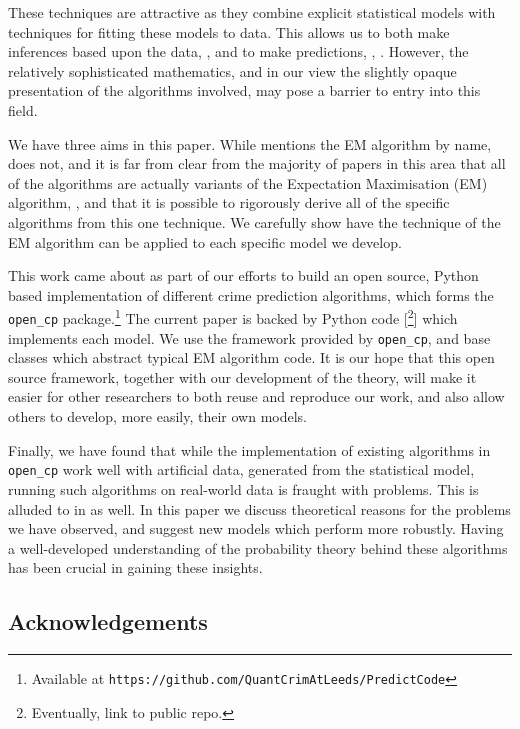 \documentclass[twoside,a4paper]{article}
\theoremstyle{plain}
\theoremstyle{definition}
\begin{document}
These techniques are attractive as they combine explicit statistical models with techniques
for fitting these models to data.  This allows us to both make inferences based upon the
data, \cite[Section~4]{sepp}, and to make predictions, \cite[Section~5]{sepp}, \cite{sepp2, rc}.
However, the relatively sophisticated mathematics, and in our view the slightly
opaque presentation of the algorithms involved, may pose a barrier to entry into this field.

We have three aims in this paper.  While \cite{sepp2} mentions the EM algorithm by name,
\cite{sepp} does not, and it is far from clear from the majority of papers in this area
that all of the algorithms are actually variants of the Expectation Maximisation (EM)
algorithm, \cite{mk}, and that it is possible to rigorously derive all of the
specific algorithms from this one technique.  We carefully show have the technique of the
EM algorithm can be applied to each specific model we develop.

This work came about as part of our efforts to build an open source, Python based
implementation of different crime prediction algorithms, which forms the \texttt{open\_cp}
package.\footnote{Available at \texttt{https://github.com/QuantCrimAtLeeds/PredictCode}}
The current paper is backed by Python code
[\footnote{Eventually, link to public repo.}]
which implements each model.  We use the framework provided by \texttt{open\_cp}, and base
classes which abstract typical EM algorithm code.  It is our hope that this open source
framework, together with our development of the theory, will make it easier for other
researchers to both reuse and reproduce our work, and also allow others to develop, more
easily, their own models.

Finally, we have found that while the implementation of existing algorithms in
\texttt{open\_cp} work well with artificial data, generated from the statistical model,
running such algorithms on real-world data is fraught with problems.  This is alluded to
in \cite{rc} as well.  In this paper we discuss theoretical reasons for the problems we
have observed, and suggest new models which perform more robustly.  Having a well-developed
understanding of the probability theory behind these algorithms has been crucial in gaining
these insights.


\subsection{Acknowledgements}
\end{document}
